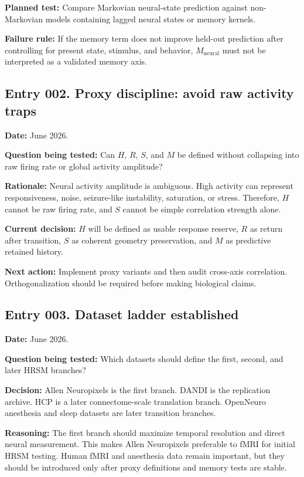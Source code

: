 \documentclass[11pt]{article}
\begin{document}
\textbf{Planned test:} Compare Markovian neural-state prediction against non-Markovian models containing lagged neural states or memory kernels.

\textbf{Failure rule:} If the memory term does not improve held-out prediction after controlling for present state, stimulus, and behavior, $M_{\mathrm{neural}}$ must not be interpreted as a validated memory axis.

\subsection*{Entry 002. Proxy discipline: avoid raw activity traps}

\textbf{Date:} June 2026.

\textbf{Question being tested:} Can $H$, $R$, $S$, and $M$ be defined without collapsing into raw firing rate or global activity amplitude?

\textbf{Rationale:} Neural activity amplitude is ambiguous. High activity can represent responsiveness, noise, seizure-like instability, saturation, or stress. Therefore, $H$ cannot be raw firing rate, and $S$ cannot be simple correlation strength alone.

\textbf{Current decision:} $H$ will be defined as usable response reserve, $R$ as return after transition, $S$ as coherent geometry preservation, and $M$ as predictive retained history.

\textbf{Next action:} Implement proxy variants and then audit cross-axis correlation. Orthogonalization should be required before making biological claims.

\subsection*{Entry 003. Dataset ladder established}

\textbf{Date:} June 2026.

\textbf{Question being tested:} Which datasets should define the first, second, and later HRSM branches?

\textbf{Decision:} Allen Neuropixels is the first branch. DANDI is the replication archive. HCP is a later connectome-scale translation branch. OpenNeuro anesthesia and sleep datasets are later transition branches.

\textbf{Reasoning:} The first branch should maximize temporal resolution and direct neural measurement. This makes Allen Neuropixels preferable to fMRI for initial HRSM testing. Human fMRI and anesthesia data remain important, but they should be introduced only after proxy definitions and memory tests are stable.
\end{document}
